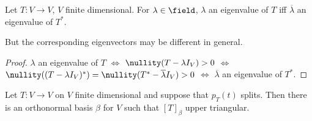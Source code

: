\begin{corollary}\label{cor:eigenvaluesofadjoint}
    Let $T : V \to V$, $V$ finite dimensional. For $\lambda \in \field$, $\lambda$ an eigenvalue of $T$ iff $\overline{\lambda}$ an eigenvalue of $T^\ast$.
\end{corollary}

\begin{remark}
    But the corresponding eigenvectors may be different in general.
\end{remark}

\begin{proof}
    $\lambda$ an eigenvalue of $T$ $\iff$ $\nullity(T - \lambda I_V) > 0$ $\iff$ $\nullity((T - \lambda I_V)^\ast) = \nullity(T^\ast - \overline{\lambda} I_V) > 0$ $\iff$ $\overline{\lambda}$ an eigenvalue of $T^\ast$.
\end{proof}

\begin{lemma}
    Let $T : V \to V$ on $V$ finite dimensional and suppose that $p_T(t)$ splits. Then there is an orthonormal basis $\beta$ for $V$ such that $[T]_\beta$ upper triangular.
\end{lemma}

